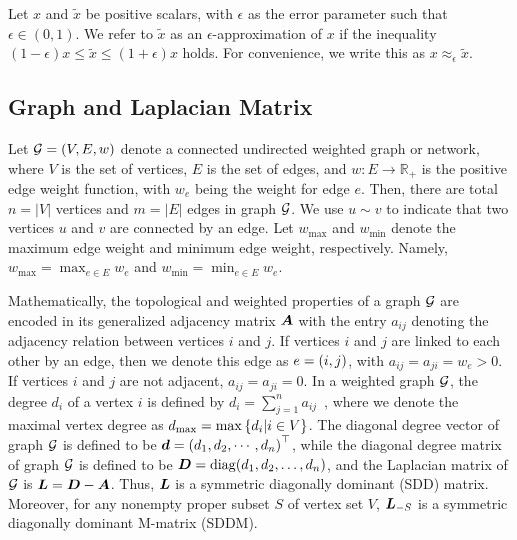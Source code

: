 \documentclass[10pt,twocolumn,twoside]{IEEEtran}
\begin{document}



\begin{definition}
    Let \(x\) and \(\tilde{x}\) be positive scalars, with \(\epsilon\) as the error parameter such that \(\epsilon\in(0,1)\). We refer to \(\tilde{x}\) as an \(\epsilon\)-approximation of \(x\) if the inequality \((1-\epsilon)x\le \tilde{x}\le(1+\epsilon)x\) holds. For convenience, we write this as \(x\approx_{\epsilon}\tilde{x}\).
\end{definition}



\subsection{Graph and Laplacian Matrix}\label{sub:lap}

Let \(\mathcal{G}=(V,E,w)\) denote a connected undirected weighted graph or network,  where \(V\) is the set of vertices,  \(E\) is the set of edges, and  \(w: E\to \mathbb{R}_{+}\) is the positive edge weight function, with \(w_e\) being the weight for edge \(e\). Then, there are total \(n=|V|\) vertices and \(m=|E|\) edges in graph \(\mathcal{G}\). We use \(u \sim v\) to indicate that two vertices \(u\) and \(v\) are connected by an edge. Let \(w_{\max}\) and \(w_{\min}\) denote the maximum edge weight and minimum edge weight, respectively. Namely, \(w_{\max}=\max_{e\in E} w_e \) and \(w_{\min}=\min_{e\in E} w_e\).

Mathematically, the topological and weighted properties of a graph \(\mathcal{G}\) are encoded in its generalized adjacency matrix \(\boldsymbol{A}\) with the entry \(a_{ij}\) denoting the adjacency relation between vertices \(i\) and \(j\). If vertices \(i\) and \(j\) are linked to each other by an edge, then we denote this edge as \(e=\left( i,j \right)\), with \(a_{ij}= a_{ji}=w_{e}> 0\). If vertices \(i\) and \(j\) are not adjacent, \(a_{ij}=a_{ji}=0\). In a weighted graph \(\mathcal{G}\), the degree \(d_i\) of a vertex \(i\) is defined by \(d_i=\sum_{j=1}^n a_{ij}\)~\cite{BaBaPaVe04}, where we denote the maximal vertex degree as \(d_{\max}=\max\left\{d_i|i\in V \right\}\).
The diagonal degree vector of graph \(\mathcal{G}\) is defined to be \(\boldsymbol{d}=\left( d_1,d_2,\cdots,d_n \right)^\top\), while the diagonal degree matrix of graph \(\mathcal{G}\) is defined to be \({\boldsymbol{D}} = {\rm diag}(d_1, d_2, \ldots, d_n)\), and the Laplacian matrix of \(\mathcal{G}\) is \({\boldsymbol{L}}={\boldsymbol{D}}-{\boldsymbol{A}}\). Thus, \(\boldsymbol{L}\)  is a symmetric diagonally dominant (SDD) matrix. Moreover, for
any  nonempty  proper subset  \(S \) of vertex set $V$, \(\boldsymbol{L}_{-S}\) is a symmetric diagonally dominant M-matrix (SDDM).
\end{document}
